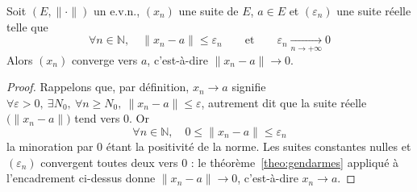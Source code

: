 \documentclass[11pt]{article}
\begin{document}
\begin{coro}
\label{coro:encadrement-evn}
Soit $(E,\|\cdot\|)$ un e.v.n., $(x_n)$ une suite de $E$, $a\in E$ et $(\varepsilon_n)$ une suite réelle telle que
\[\forall n\in\mathbb{N},\quad \|x_n-a\| \leq \varepsilon_n \qquad\text{et}\qquad \varepsilon_n\xrightarrow[n\to+\infty]{}0\]
Alors $(x_n)$ converge vers $a$, c'est-à-dire $\|x_n-a\|\to 0$.
\end{coro}

\begin{proof}
Rappelons que, par définition, $x_n\to a$ signifie $\forall\varepsilon>0,\ \exists N_0,\ \forall n\geq N_0,\ \|x_n-a\|\leq\varepsilon$, autrement dit que la suite réelle $\big(\|x_n-a\|\big)$ tend vers $0$. Or
\[\forall n\in\mathbb{N},\quad 0 \leq \|x_n-a\| \leq \varepsilon_n\]
la minoration par $0$ étant la positivité de la norme. Les suites constantes nulles et $(\varepsilon_n)$ convergent toutes deux vers $0$ : le théorème~\ref{theo:gendarmes} appliqué à l'encadrement ci-dessus donne $\|x_n-a\|\to 0$, c'est-à-dire $x_n\to a$.
\end{proof}
\end{document}
